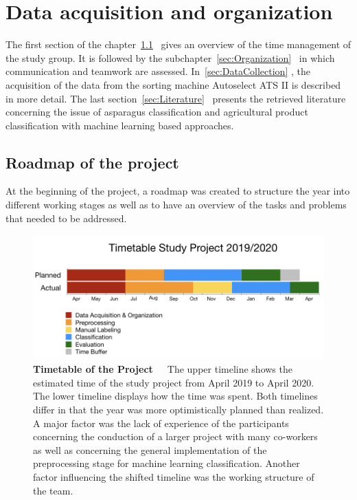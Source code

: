 
\section{Data acquisition and organization}
\label{ch:DataAcquisition}

The first section of the chapter~\ref{sec:Roadmap}~ gives an overview of the time management of the study group. It is followed by the subchapter~\ref{sec:Organization}~ in which communication and teamwork are assessed. In~\ref{sec:DataCollection} , the acquisition of the data from the sorting machine Autoselect ATS II is described in more detail. The last section~\ref{sec:Literature}~ presents the retrieved literature concerning the issue of asparagus classification and agricultural product classification with machine learning based approaches.

\subsection{Roadmap of the project}
\label{sec:Roadmap}

At the beginning of the project, a roadmap was created to structure the year into different working stages as well as to have an overview of the tasks and problems that needed to be addressed.

\begin{figure}[h]
	\centering
	\includegraphics[scale=0.43]{Figures/chapter02/new_timetable.png}
	\decoRule
	\caption[Timetable of the Project]{\textbf{Timetable of the Project}~~~The upper timeline shows the estimated time of the study project from April 2019 to April 2020. The lower timeline displays how the time was spent. Both timelines differ in that the year was more optimistically planned than realized. A major factor was the lack of experience of the participants concerning the conduction of a larger project with many co-workers as well as concerning the general implementation of the preprocessing stage for machine learning classification. Another factor influencing the shifted timeline was the working structure of the team.}
	\label{fig:Timetable}
\end{figure}

